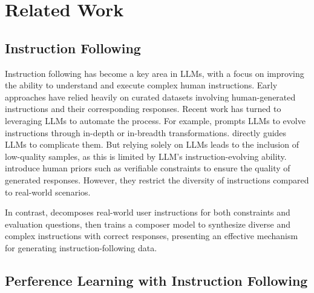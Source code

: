 \section{Related Work}
\subsection{Instruction Following}

Instruction following has become a key area in LLMs, with a focus on improving the ability to understand and execute complex human instructions. Early approaches \citep{wei2021finetuned,no_robots,jiang2023followbench} have relied heavily on curated datasets involving human-generated instructions and their corresponding responses. Recent work has turned to leveraging LLMs to automate the process. For example, \citet{xu2023wizardlm} prompts LLMs to evolve instructions through in-depth or in-breadth transformations. \citet{sun2024conifer} directly guides LLMs to complicate them. But relying solely on LLMs leads to the inclusion of low-quality samples, as this is limited by LLM's instruction-evolving ability. \citet{wang-etal-2023-self-instruct,dong2024self} introduce human priors such as verifiable constraints to ensure the quality of generated responses. However, they restrict the diversity of instructions compared to real-world scenarios.

In contrast, \method decomposes real-world user instructions for both constraints and evaluation questions, then trains a composer model to synthesize diverse and complex instructions with correct responses, presenting an effective mechanism for generating instruction-following data.


\subsection{Perference Learning with Instruction Following}

